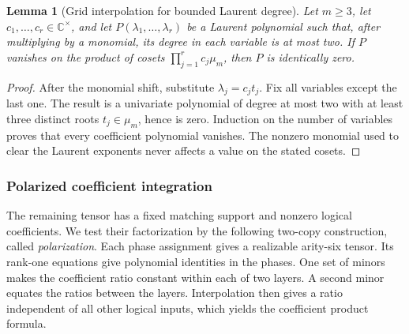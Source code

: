 \documentclass[11pt,letterpaper,onecolumn]{article}
\theoremstyle{plain}
\newtheorem{lemma}[lemma]{Lemma}
\theoremstyle{definition}
\theoremstyle{remark}
\begin{document}
\begin{lemma}[Grid interpolation for bounded Laurent degree]
\label{lem:nd-grid-interpolation}
Let \(m\ge3\), let \(c_1,\ldots,c_r\in\mathbb C^\times\), and let
\(P(\lambda_1,\ldots,\lambda_r)\) be a Laurent polynomial such that,
after multiplying by a monomial, its degree in each variable is at most
two.  If \(P\) vanishes on the product of cosets
\(\prod_{j=1}^r c_j\mu_m\), then \(P\) is identically zero.
\end{lemma}

\begin{proof}
After the monomial shift, substitute \(\lambda_j=c_jt_j\).  Fix all
variables except the last one.  The result is a univariate polynomial of
degree at most two with at least three distinct roots \(t_j\in\mu_m\),
hence is zero.  Induction on the number of variables proves that every
coefficient polynomial vanishes.  The nonzero monomial used to clear the
Laurent exponents never affects a value on the stated cosets.
\end{proof}

\subsubsection{Polarized coefficient integration}
\label{proofsubsec:nd-polarization}

The remaining tensor has a fixed matching support and nonzero logical
coefficients.  We test their factorization by the following two-copy
construction, called \emph{polarization}.  Each phase assignment gives a realizable arity-six tensor.  Its rank-one equations give polynomial identities in the phases.
One set of minors makes the coefficient ratio constant within each of
two layers. A second minor equates the ratios between the layers.
Interpolation then gives a ratio independent of all other logical inputs,
which yields the coefficient product formula.
\end{document}
